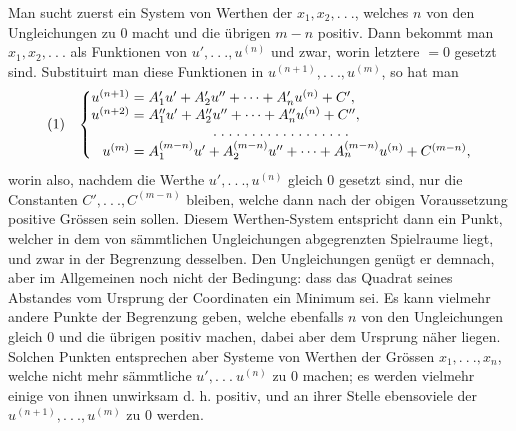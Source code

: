 \indent Man sucht zuerst ein System von Werthen der \(x_1,x_2,.\ .\ .\), welches \(n\) von den Ungleichungen zu 0 macht und die übrigen \(m-n\) positiv. Dann bekommt man \(x_1,x_2,.\ .\ .\) als Funktionen von \(u',.\ .\ .,u^{(n)}\) und zwar, worin letztere \(=0\) gesetzt sind. Substituirt man diese Funktionen in \(u^{(n+1)},.\ .\ .,u^{(m)}\), so hat man
\[
\begin{array}{@{}l@{\quad}l@{}}
(1)&\left\{\begin{array}{@{}r@{}l@{}}
u^{(n+1)}={}&A_1'u'+A_2'u''+\mathinner{\cdotp\cdotp\cdotp}+A_n'u^{(n)}+C',\\
u^{(n+2)}={}&A_1''u'+A_2''u''+\mathinner{\cdotp\cdotp\cdotp}+A_n''u^{(n)}+C'',\\
\multicolumn{2}{c}{.\; .\; .\; .\; .\; .\; .\; .\; .\; .\; .\; .\; .\; .\; .\; .\; .\; .}\\
u^{(m)}={}&A_1^{(m-n)}u'+A_2^{(m-n)}u''+\mathinner{\cdotp\cdotp\cdotp}+A_n^{(m-n)}u^{(n)}+C^{(m-n)},
\end{array}\right.
\end{array}
\]
\noindent worin also, nachdem die Werthe \(u',.\ .\ .,u^{(n)}\) gleich 0 gesetzt sind, nur die Constanten \(C',.\ .\ .,C^{(m-n)}\) bleiben, welche dann nach der obigen Voraussetzung positive Grössen sein sollen. Diesem Werthen-System entspricht dann ein Punkt, welcher in dem von sämmtlichen Ungleichungen abgegrenzten Spielraume liegt, und zwar in der Begrenzung desselben. Den Ungleichungen genügt er demnach, aber im Allgemeinen noch nicht der Bedingung: dass das Quadrat seines Abstandes vom Ursprung der Coordinaten ein Minimum sei. Es kann vielmehr andere Punkte der Begrenzung geben, welche ebenfalls \(n\) von den Ungleichungen gleich 0 und die übrigen positiv machen, dabei aber dem Ursprung näher liegen. Solchen Punkten entsprechen aber Systeme von Werthen der Grössen \(x_1,.\ .\ .,x_n\), welche nicht mehr sämmtliche \(u',.\ .\ .\ u^{(n)}\) zu 0 machen; es werden vielmehr einige von ihnen unwirksam d. h. positiv, und an ihrer Stelle ebensoviele der \(u^{(n+1)},.\ .\ .,u^{(m)}\) zu 0 werden.

